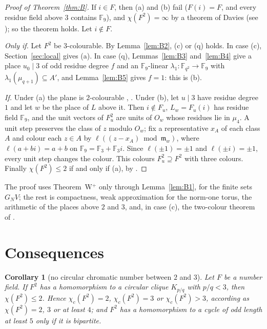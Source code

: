 \documentclass[11pt,a4paper]{amsart}
\newtheorem{corollary}{Corollary}
\theoremstyle{remark}
\newcommand{\F}{\mathbb{F}}
\begin{document}
\begin{proof}[Proof of Theorem~\ref{thm:B}]
If $i\in F$, then (a) and (b) fail ($F(i)=F$, and every residue field above $3$ contains $\F_9$), and
$\chi(F^2)=\infty$ by a theorem of Davies \cite{Davies} (see \cite[Proposition~3]{PP}); so
the theorem holds. Let $i\notin F$.

\emph{Only if.} Let $F^2$ be $3$-colourable. By Lemma~\ref{lem:B2}, (c) or (q) holds. In case (c), Section~\ref{sec:local}
gives (a). In case (q), Lemmas~\ref{lem:B3} and~\ref{lem:B4} give a place $u_0\mid3$ of odd residue degree $f$ and
an $\F_9$-linear $\lambda_1:\F_{q^2}\to\F_9$ with $\lambda_1(\mu_{q+1})\subseteq A'$, and Lemma~\ref{lem:B5} gives
$f=1$: this is (b).

\emph{If.} Under (a) the plane is $2$-colourable \cite[Theorem~A$'$]{MM}, \cite[Theorem~1]{TC}. Under (b), let
$u\mid3$ have residue degree $1$ and let $w$ be the place of $L$ above it. Then $i\notin F_u$, $L_w=F_u(i)$ has
residue field $\F_9$, and the unit vectors of $F_u^2$ are units of $O_w$ whose residues lie in $\mu_4$. A unit step
preserves the class of $z$ modulo $O_w$; fix a representative $x_A$ of each class $A$ and colour each $z\in A$ by
$\ell((z-x_A)\bmod\mathfrak m_w)$, where $\ell(a+bi)=a+b$ on $\F_9=\F_3+\F_3i$. Since $\ell(\pm1)=\pm1$ and
$\ell(\pm i)=\pm1$, every unit step changes the colour. This colours $F_u^2\supseteq F^2$ with three colours.
Finally $\chi(F^2)\le2$ if and only if (a), by \cite[Theorem~1]{TC}.
\end{proof}

The proof uses Theorem~W$^+$ only through Lemma~\ref{lem:B1}, for the finite sets $G_NV$; the rest is
compactness, weak approximation for the norm-one torus, the arithmetic of the places above $2$ and $3$, and, in case
(c), the two-colour theorem of \cite{TC}.

\section{Consequences}\label{sec:cor}

\begin{corollary}[no circular chromatic number between $2$ and $3$]\label{cor:B6}
Let $F$ be a number field. If $F^2$ has a homomorphism to a circular clique $K_{p/q}$ with $p/q<3$, then
$\chi(F^2)\le2$. Hence $\chi_c(F^2)=2$, $\chi_c(F^2)=3$ or $\chi_c(F^2)>3$, according as $\chi(F^2)=2$, $3$ or at
least $4$; and $F^2$ has a homomorphism to a cycle of odd length at least $5$ only if it is bipartite.
\end{corollary}
\end{document}
